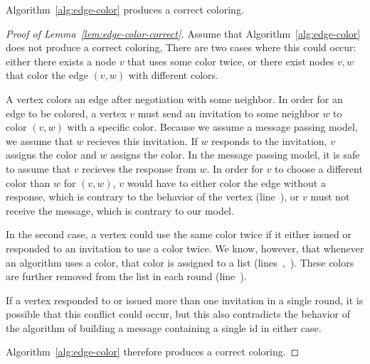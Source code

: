 \begin{lem}
\label{lem:edge-color-correct}
Algorithm~\ref{alg:edge-color} produces a correct coloring. 
\end{lem}
\begin{proof}[Proof of Lemma~\ref{lem:edge-color-correct}]

Assume that Algorithm~\ref{alg:edge-color} does not produce a correct coloring, There are two cases where this could occur: either there exists a node $v$ that uses some color twice, or there exist nodes $v,w$ that color the edge $(v,w)$ with different colors. 

A vertex colors an edge after negotiation with some neighbor. In order for an edge to be colored, a vertex $v$ must send an invitation to some neighbor $w$ to color $(v,w)$ with a specific color. Because we assume a message passing model, we assume that $w$ recieves this invitation. If $w$ responds to the invitation, $v$ assigns the color and $w$ assigns the color. In the message passing model, it is safe to assume that $v$ recieves the response from $w$. In order for $v$ to choose a different color than $w$ for $(v,w)$, $v$ would have to either color the edge without a response, which is contrary to the behavior of the vertex (line~), or $v$ must not receive the message, which is contrary to our model.

In the second case, a vertex could use the same color twice if it either issued or responded to an invitation to use a color twice. We know, however, that whenever an algorithm uses a color, that color is assigned to a list (lines~,~). These colors are further removed from the list in each round (line~).

If a vertex responded to or issued more than one invitation in a single round, it is possible that this conflict could occur, but this also contradicts the behavior of the algorithm of building a message containing a single id in either case.

Algorithm~\ref{alg:edge-color} therefore produces a correct coloring.
\end{proof}
